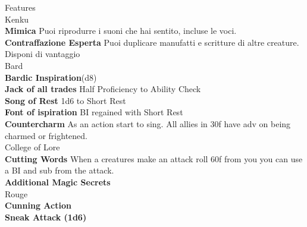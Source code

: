 \documentclass[11pt]{article}
\begin{document}
\begin{minipage}[t]{.5\textwidth}
{\huge \Fontauri Features}\\
\textcolor{OCRA}{Kenku}\\
\textbf{Mimica} Puoi riprodurre i suoni che hai sentito, incluse le voci.\\
\textbf{Contraffazione Esperta} Puoi duplicare manufatti e scritture di altre creature. Disponi di vantaggio \\
\textcolor{OCRA}{Bard}\\
\textbf{Bardic Inspiration}(d8)\\
\textbf{Jack of all trades} Half Proficiency to Ability Check\\
\textbf{Song of Rest} 1d6 to Short Rest\\
\textbf{Font of ispiration} BI regained with Short Rest\\
\textbf{Countercharm} As an action start to sing. All allies in 30f have adv on being charmed or frightened.\\
\textcolor{OCRA}{College of Lore}\\
\textbf{Cutting Words} When a creatures make an attack roll 60f from you you can use a BI and sub from the attack.\\
\textbf{Additional Magic Secrets}\\
\textcolor{OCRA}{Rouge}\\
\textbf{Cunning Action}\\
\textbf{Sneak Attack (1d6)}\\
\end{minipage}
\end{document}
